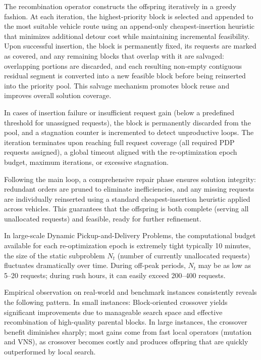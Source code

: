 \documentclass[pdflatex]{sn-jnl}
\begin{document}
The recombination operator constructs the offspring iteratively in a greedy fashion. At each iteration, the highest-priority block is selected and appended to the most suitable vehicle route using an append-only cheapest-insertion heuristic that minimizes additional detour cost while maintaining incremental feasibility. Upon successful insertion, the block is permanently fixed, its requests are marked as covered, and any remaining blocks that overlap with it are salvaged: overlapping portions are discarded, and each resulting non-empty contiguous residual segment is converted into a new feasible block before being reinserted into the priority pool. This salvage mechanism promotes block reuse and improves overall solution coverage.

In cases of insertion failure or insufficient request gain (below a predefined threshold for unassigned requests), the block is permanently discarded from the pool, and a stagnation counter is incremented to detect unproductive loops. The iteration terminates upon reaching full request coverage (all required PDP requests assigned), a global timeout aligned with the re-optimization epoch budget, maximum iterations, or excessive stagnation.

Following the main loop, a comprehensive repair phase ensures solution integrity: redundant orders are pruned to eliminate inefficiencies, and any missing requests are individually reinserted using a standard cheapest-insertion heuristic applied across vehicles. This guarantees that the offspring is both complete (serving all unallocated requests) and feasible, ready for further refinement.

In large-scale Dynamic Pickup-and-Delivery Problems, the computational budget available for each re-optimization epoch is extremely tight typically 10 minutes, the size of the static subproblem \(N_t\) (number of currently unallocated requests) fluctuates dramatically over time. During off-peak periods, \(N_t\) may be as low as 5–20 requests; during rush hours, it can easily exceed 200–400 requests.

Empirical observation on real-world and benchmark instances consistently reveals the following pattern.
In small instances: Block-oriented crossover yields significant improvements due to manageable search space and effective recombination of high-quality parental blocks. In large instances, the crossover benefit diminishes sharply; most gains come from fast local operators (mutation and VNS), as crossover becomes costly and produces offspring that are quickly outperformed by local search.
\end{document}
